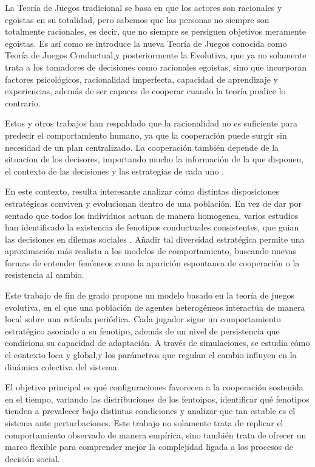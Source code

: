 \documentclass[a4paper,12pt]{report}
\begin{document}
La Teoría de Juegos tradicional se basa en que los actores son racionales y egoistas en su totalidad, pero sabemos que las personas no siempre son totalmente racionales, es decir, que no siempre se persiguen objetivos meramente egoistas.
Es así como se introduce la nueva Teoría de Juegos conocida como Teoría de Juegos Conductual\cite{camerer2003behavioral,kagel1995handbook},y posteriormente la Evolutiva\cite{sigmund2010calculus,gintis2009game}, que ya no solamente trata a los tomadores de decisiones como racionales egoistas, sino que incorporan factores psicológicos, racionalidad imperfecta, capacidad de aprendizaje y experiencias, además de ser capaces de cooperar cuando la teoría predice lo contrario.

Estos y otros trabajos han respaldado que la racionalidad no es suficiente para predecir el comportamiento humano, ya que la cooperación puede surgir sin necesidad de un plan centralizado. La cooperación también depende de la situacion de los decisores, importando mucho la información de la que disponen, el contexto de las decisiones y las estrategias de cada uno \cite{sigmund2010calculus,gintis2009game,myerson1991game}.

En este contexto, resulta interesante analizar cómo distintas disposiciones estratégicas conviven y evolucionan dentro de una población. En vez de dar por sentado que todos los individuos actuan de manera homogenea, varios estudios han identificado la existencia de fenotipos conductuales consistentes, que guian las decisiones en dilemas sociales \cite{paper_principal}. Añadir tal diversidad estratégica permite una aproximación más realista a los modelos de comportamiento, buscando nuevas formas de entender fenómeos como la aparición espontanea de cooperación o la resistencia al cambio.

\newpage

Este trabajo de fin de grado propone un modelo basado en la teoría de juegos evolutiva, en el que una población de agentes heterogéneos  interactúa de manera local sobre una retícula periódica. Cada jugador sigue un comportamiento estratégico asociado a su fenotipo, además de un nivel de persistencia que condiciona su capacidad de adaptación. A través de simulaciones, se estudia cómo el contexto loca y global,y los parámetros que regulan el cambio influyen en la dinámica colectiva del sistema.

El objetivo principal es qué configuraciones favorecen a la cooperación sostenida en el tiempo, variando las distribuciones de los fentoipos, identificar qué fenotipos tienden a prevalecer bajo distintas condiciones y analizar que tan estable es el sistema ante perturbaciones. Este trabajo no solamente trata de replicar el comportamiento observado de manera empírica, sino también trata de ofrecer un marco flexible para comprender mejor la complejidad ligada a los procesos de decisión social.
\end{document}
